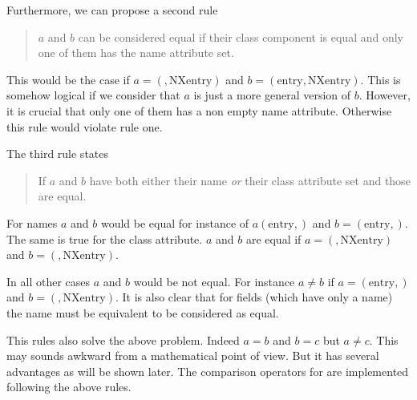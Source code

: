 Furthermore, we can propose a second rule
\begin{quote}
    $a$ and $b$ can be considered equal if their class component is equal 
    and only one of them has the name attribute set. 
\end{quote}
This would be the case if $a=(,\mathrm{NXentry})$ and
$b=(\mathrm{entry},\mathrm{NXentry})$. This is somehow logical if we consider
that $a$ is just a more general version of $b$. However, it is crucial that only
one of them has a non empty name attribute. Otherwise this rule would violate
rule one.

The third rule states
\begin{quote}
    If $a$ and $b$ have both either their name \emph{or} their class attribute
    set and those are equal.
\end{quote}
For names $a$ and $b$ would be equal for instance of $a(\mathrm{entry},)$ and 
$b=(\mathrm{entry},)$. The same is true for the class attribute. 
$a$ and $b$ are equal if $a=(,\mathrm{NXentry})$ and $b=(,\mathrm{NXentry})$.

In all other cases $a$ and $b$ would be not equal. For instance $a\not=b$ if 
$a=(\mathrm{entry},)$ and $b=(,\mathrm{NXentry})$. It is also clear that for
fields (which have only a name) the name must be equivalent to be considered as
equal. 

This rules also solve the above problem. Indeed $a=b$ and $b=c$ but $a\not=c$. 
This may sounds awkward from a mathematical point of view. But it has several
advantages as will be shown later.
The comparison operators for  are implemented
following the above rules.

